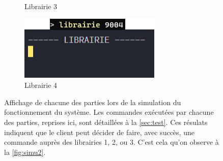 \documentclass[
  french,
  twocolumn,
	9pt, %
]{fphw}
\begin{document}
\begin{figure}[h]
\begin{subfigure}{0.28\textwidth}
    \caption{Librairie 3}
    \label{fig:lib3}
  \end{subfigure}
  \begin{subfigure}{0.24\textwidth}
    \centering
    \includegraphics[width=\textwidth]{librarie4.png}
    \caption{Librairie 4}
    \label{fig:lib4}
  \end{subfigure}
  \caption{Affichage de chacune des parties lors de la simulation du fonctionnement du système. Les commandes exécutées par chacune des parties, reprises ici, sont détaillées à la \cref{sec:test}. Ces résulats indiquent que le client peut décider de faire, avec succès, une commande auprès des librairies 1, 2, ou 3. C'est cela qu'on observe à la \cref{fig:simu2}.}
  \label{fig:simu}
\end{figure}
\end{document}
